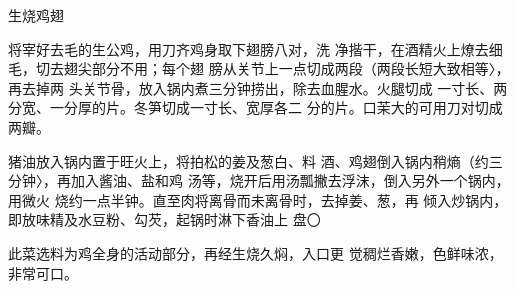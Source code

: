 \begin{recipe}[生烧大转弯]{生烧鸡翅}

\ingredients


\cooking

\step 将宰好去毛的生公鸡，用刀齐鸡身取下翅膀八对，洗
净揩干，在酒精火上燎去细毛，切去翅尖部分不用；每个翅 膀从关节上一点切成两段（两段长短大致相等〉，再去掉两 头关节骨，放入锅内煮三分钟捞出，除去血腥水。火腿切成 一寸长、两分宽、一分厚的片。冬笋切成一寸长、宽厚各二 分的片。口茉大的可用刀对切成两瓣。

\step 猪油放入锅内置于旺火上，将拍松的姜及葱白、料 酒、鸡翅倒入锅内稍熵（约三分钟〉，再加入酱油、盐和鸡 汤等，烧开后用汤瓢撇去浮沫，倒入另外一个锅内，用微火 烧约一点半钟。直至肉将离骨而未离骨时，去掉姜、葱，再 倾入炒锅内，即放味精及水豆粉、勾芡，起锅时淋下香油上 盘〇

\notes

此菜选料为鸡全身的活动部分，再经生烧久焖，入口更 觉稠烂香嫩，色鲜味浓，非常可口。

\end{recipe}

